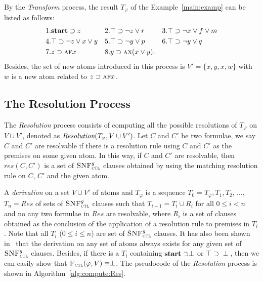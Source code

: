 \documentclass[letterpaper]{article}
\begin{document}
\begin{example}\label{examp:Tran}
By the \emph{Transform} process, the result $T_{\varphi}$ of the Example~\ref{main:examp} can be listed as follows:
\begin{align*}
& 1. \textbf{start}\supset z && 2. \top \supset \neg z \vee r && 3.\top \supset \neg x\vee f \vee m\\
& 4. \top \supset \neg z \vee x \vee y && 5.\top \supset \neg y \vee p && 6.\top \supset \neg y \vee q\\
& 7. z \supset \textsc{a} \textsc{f} x && 8. y \supset \textsc{a} \textsc{x}(x\vee y).
\end{align*}
Besides, the set of new atoms introduced in this process is $V'=\{x, y,x, w\}$ with $w$ is a new atom related to $z \supset \textsc{a} \textsc{f} x$. %
\end{example}




\subsection{The Resolution Process}
The \emph{Resolution} process consists of computing all the possible resolutions of $T_{\varphi}$ on $V\cup V'$, denoted as $\emph{Resolution}(T_{\varphi}, V\cup V')$.
Let $C$ and $C'$ be two formulae, we say $C$ and $C'$ are resolvable if there is a resolution rule using $C$ and $C'$ as the premises on some given atom. In this way, if $C$ and $C'$ are resolvable, then $res(C,C')$ is a set of ${\textsc{SNF}_{\textsc{ctl}}^g}$ clauses obtained by using the matching resolution rule on $C$, $C'$ and the given atom.

A \emph{derivation} on a set $V\cup V'$ of atoms and $T_{\varphi}$ is a sequence $T_0=T_{\varphi}, T_1, T_2$, $\dots$, $T_n=Res$ of sets of ${\textsc{SNF}_{\textsc{ctl}}^g}$ clauses such that $T_{i+1} = T_i \cup R_i$ for all $0\leq i < n$ and no any two formulae in $Res$ are resolvable, where $R_i$ is a set of clauses obtained as the conclusion of the application of a resolution rule to premises in $T_i$.
Note that all $T_i$ ($0 \leq i \leq n$) are set of ${\textsc{SNF}_{\textsc{ctl}}^g}$ clauses. 
It has also been shown in~\cite{zhang2009refined} that the derivation on any set of atoms always exists for any given set of ${\textsc{SNF}_{\textsc{ctl}}^g}$ clauses. 
Besides, if there is a $T_i$ containing $\textbf{start}\supset \perp$ or $\top\supset \perp$, then we can easily show that ${\textsc{F}_{\textsc{ctl}}}(\varphi, V)\equiv\perp$.
The pseudocode of the \emph{Resolution} process is  shown in Algorithm~\ref{alg:compute:Res}.

\end{document}

